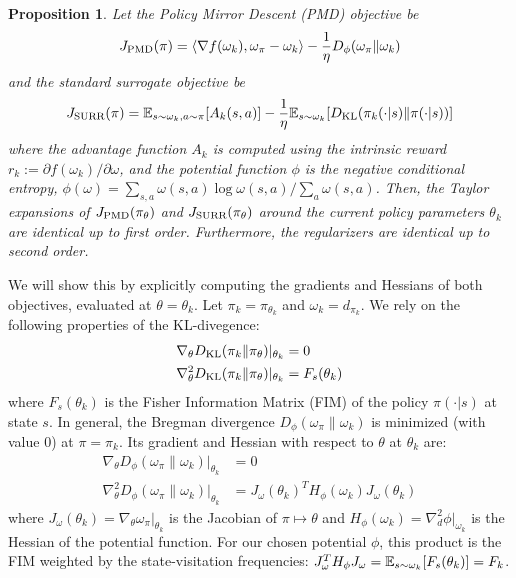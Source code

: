 \documentclass{article}
\theoremstyle{plain}
\newtheorem{proposition}[theorem]{Proposition}
\theoremstyle{definition}
\theoremstyle{remark}
\begin{document}
\begin{proposition}
Let the Policy Mirror Descent (PMD) objective be
\begin{equation}
    J_{\textup{PMD}}(\pi) = \langle \nabla f(\omega_k), \omega_\pi - \omega_k \rangle - \frac{1}{\eta} D_\phi(\omega_\pi \| \omega_k)
\end{equation}
and the standard surrogate objective be
\begin{equation}
    J_{\textup{SURR}}(\pi) = \mathbb{E}_{s \sim \omega_k, a \sim \pi}[A_k(s,a)] - \frac{1}{\eta} \mathbb{E}_{s \sim \omega_k} [D_{\mathrm{KL}}(\pi_k(\cdot|s) \| \pi(\cdot|s))]
\end{equation}
where the advantage function $A_k$ is computed using the intrinsic reward $r_k := \partial f(\omega_k)/\partial \omega$, and the potential function $\phi$ is the negative conditional entropy, $\phi(\omega) = \sum_{s,a} \omega(s,a) \log \omega(s,a)/\sum_a \omega(s,a)$.
Then, the Taylor expansions of $J_{\textup{PMD}}(\pi_\theta)$ and $J_{\textup{SURR}}(\pi_\theta)$ around the current policy parameters $\theta_k$ are identical up to first order.
Furthermore, the regularizers are identical up to second order.
\end{proposition}

We will show this by explicitly computing the gradients and Hessians of both objectives, evaluated at $\theta = \theta_k$. 
Let $\pi_k = \pi_{\theta_k}$ and $\omega_k = d_{\pi_k}$. We rely on the following properties of the KL-divegence:
\begin{align*}
    \nabla_\theta D_{\mathrm{KL}}(\pi_k \| \pi_\theta) |_{\theta_k} &= 0 \\
    \nabla^2_\theta D_{\mathrm{KL}}(\pi_k \| \pi_\theta) |_{\theta_k} &= F_s(\theta_k)
\end{align*}
where $F_s(\theta_k)$ is the Fisher Information Matrix (FIM) of the policy $\pi(\cdot|s)$ at state $s$.
In general, the Bregman divergence $D_\phi(\omega_\pi \| \omega_k)$ is minimized (with value 0) at $\pi=\pi_k$. 
Its gradient and Hessian with respect to $\theta$ at $\theta_k$ are:
\begin{align*}
    \nabla_\theta D_\phi(\omega_\pi \| \omega_k) |_{\theta_k} &= 0 \\
    \nabla^2_\theta D_\phi(\omega_\pi \| \omega_k) |_{\theta_k} &= J_\omega(\theta_k)^T H_\phi(\omega_k) J_\omega(\theta_k)
\end{align*}
where $J_\omega(\theta_k) = \nabla_\theta \omega_\pi |_{\theta_k}$ is the Jacobian of $\pi\mapsto\theta$ and $H_\phi(\omega_k) = \nabla_d^2 \phi |_{\omega_k}$ is the Hessian of the potential function. For our chosen potential $\phi$, this product is the FIM weighted by the state-visitation frequencies: $J_\omega^T H_\phi J_\omega = \mathbb{E}_{s \sim \omega_k}[F_s(\theta_k)] = F_k$.
\end{document}
